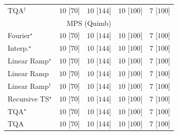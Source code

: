\begin{tabular}{l|cccc|}
TQA$^\dagger$ & {\cellcolor[HTML]{00441B}} \color[HTML]{F1F1F1} $10$ [$70$] & {\cellcolor[HTML]{00441B}} \color[HTML]{F1F1F1} $10$ [$144$] & {\cellcolor[HTML]{00441B}} \color[HTML]{F1F1F1} $10$ [$100$] & {\cellcolor[HTML]{F7FCF5}} \color[HTML]{000000} $7$ [$100$] \\
\cline{1-5}
\multicolumn{5}{c}{\rule{0pt}{8pt}MPS (Quimb)} \\
\midrule
Fourier$^\star$ & {\cellcolor[HTML]{00441B}} \color[HTML]{F1F1F1} $10$ [$70$] & {\cellcolor[HTML]{00441B}} \color[HTML]{F1F1F1} $10$ [$144$] & {\cellcolor[HTML]{00441B}} \color[HTML]{F1F1F1} $10$ [$100$] & {\cellcolor[HTML]{F7FCF5}} \color[HTML]{000000} $7$ [$100$] \\
Interp.$^\star$ & {\cellcolor[HTML]{00441B}} \color[HTML]{F1F1F1} $10$ [$70$] & {\cellcolor[HTML]{00441B}} \color[HTML]{F1F1F1} $10$ [$144$] & {\cellcolor[HTML]{00441B}} \color[HTML]{F1F1F1} $10$ [$100$] & {\cellcolor[HTML]{F7FCF5}} \color[HTML]{000000} $7$ [$100$] \\
Linear Ramp$^\star$ & {\cellcolor[HTML]{00441B}} \color[HTML]{F1F1F1} $10$ [$70$] & {\cellcolor[HTML]{00441B}} \color[HTML]{F1F1F1} $10$ [$144$] & {\cellcolor[HTML]{00441B}} \color[HTML]{F1F1F1} $10$ [$100$] & {\cellcolor[HTML]{F7FCF5}} \color[HTML]{000000} $7$ [$100$] \\
Linear Ramp & {\cellcolor[HTML]{00441B}} \color[HTML]{F1F1F1} $10$ [$70$] & {\cellcolor[HTML]{00441B}} \color[HTML]{F1F1F1} $10$ [$144$] & {\cellcolor[HTML]{00441B}} \color[HTML]{F1F1F1} $10$ [$100$] & {\cellcolor[HTML]{F7FCF5}} \color[HTML]{000000} $7$ [$100$] \\
Linear Ramp$^\dagger$ & {\cellcolor[HTML]{00441B}} \color[HTML]{F1F1F1} $10$ [$70$] & {\cellcolor[HTML]{00441B}} \color[HTML]{F1F1F1} $10$ [$144$] & {\cellcolor[HTML]{00441B}} \color[HTML]{F1F1F1} $10$ [$100$] & {\cellcolor[HTML]{F7FCF5}} \color[HTML]{000000} $7$ [$100$] \\
Recursive TS$^\star$ & {\cellcolor[HTML]{00441B}} \color[HTML]{F1F1F1} $10$ [$70$] & {\cellcolor[HTML]{00441B}} \color[HTML]{F1F1F1} $10$ [$144$] & {\cellcolor[HTML]{00441B}} \color[HTML]{F1F1F1} $10$ [$100$] & {\cellcolor[HTML]{F7FCF5}} \color[HTML]{000000} $7$ [$100$] \\
TQA$^\star$ & {\cellcolor[HTML]{00441B}} \color[HTML]{F1F1F1} $10$ [$70$] & {\cellcolor[HTML]{00441B}} \color[HTML]{F1F1F1} $10$ [$144$] & {\cellcolor[HTML]{00441B}} \color[HTML]{F1F1F1} $10$ [$100$] & {\cellcolor[HTML]{F7FCF5}} \color[HTML]{000000} $7$ [$100$] \\
TQA & {\cellcolor[HTML]{00441B}} \color[HTML]{F1F1F1} $10$ [$70$] & {\cellcolor[HTML]{00441B}} \color[HTML]{F1F1F1} $10$ [$144$] & {\cellcolor[HTML]{00441B}} \color[HTML]{F1F1F1} $10$ [$100$] & {\cellcolor[HTML]{F7FCF5}} \color[HTML]{000000} $7$ [$100$] \\

\end{tabular}
